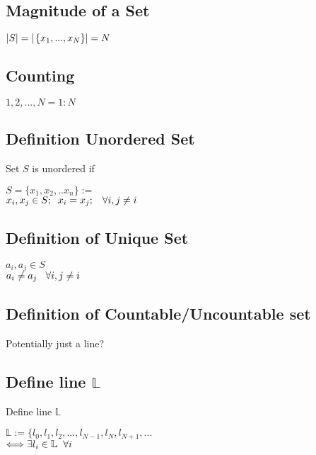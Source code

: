 \documentclass[11pt]{article}
\begin{document}
\subsection{Magnitude of a Set}
\begin{center}
$
|S| = |\hspace{.5mm} \{x_1,...,x_N\}| = N
$
\end{center}


\subsection{Counting}
\begin{center}
$1,2,...,N = 1:N$
\end{center}



\subsection{Definition Unordered Set}
Set $S$ is unordered if
\begin{center}
$
S = \{x_1,x_2,..x_n\} :=
$
\\
$
x_i,x_j \in S; \hspace{2mm} x_i = x_j; \hspace{3mm}\forall i,j \neq i
$
\end{center}





\subsection{Definition of Unique Set}
\begin{center}
$
a_i, a_j \in S
$
\\
$
a_i \neq a_j \hspace{3mm} \forall i,j \neq i
$
\end{center}





\subsection{Definition of Countable/Uncountable set}
Potentially just a line?
\subsection{Define line $\mathbb{L}$}
Define line $\mathbb{L}$
\begin{center}
$
\mathbb{L} := \{l_0,l_{1},l_{2},...,l_{N-1},l_N,l_{N+1},...
$
\\
$
\Longleftrightarrow \exists l_i \in \mathbb{L} \hspace{2mm} \forall i
$
\end{center}
\end{document}
